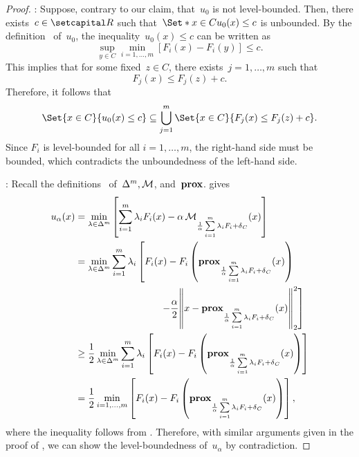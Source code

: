 \documentclass[../main]{subfiles}
\begin{document}
\begin{proof}
    : Suppose, contrary to our claim, that~$u_0$ is not level-bounded.
    Then, there exists~$c \in \setR$ such that~$\Set*{ x \in C }{ u_0(x) \le c }$ is unbounded.
    By the definition~ of~$u_0$, the inequality~$u_0(x) \le c$ can be written as
    \begin{equation}
        \sup_{y \in C} \min_{i = 1, \dots, m} [ F_i(x) - F_i(y) ] \le c.
    \end{equation}
    This implies that for some fixed~$z \in C$, there exists~$j = 1, \dots, m$ such that
    \begin{equation}
        F_j(x) \le F_j(z) + c.
    \end{equation}
    Therefore, it follows that
    \begin{equation}
        \Set{ x \in C}{ u_0(x) \le c } \subseteq \bigcup_{j = 1}^m \Set{ x \in C }{ F_j(x) \le F_j(z) + c }.
    \end{equation}
    Since $F_i$ is level-bounded for all $i = 1, \dots, m$, the right-hand side must be bounded, which contradicts the unboundedness of the left-hand side.

    : Recall the definitions~ of~$\Delta^m,\operatorname{\mathcal{M}}$, and~$\operatorname{\mathbf{prox}}$.
     gives
    \begin{equation}
        \begin{aligned}
            u_\alpha(x) &= \min_{\lambda \in \Delta^m} \left[ \sum_{i = 1}^{m} \lambda_i F_i(x) - \alpha \envelope_{\frac{1}{\alpha} \sum\limits_{i = 1}^{m} \lambda_i F_i + \indicator_C}(x) \right] \\
                      &\begin{multlined}
                          = \min_{\lambda \in \Delta^m} \sum_{i = 1}^{m} \lambda_i \left[ F_i(x) - F_i\left( \prox_{\frac{1}{\alpha} \sum\limits_{i = 1}^{m} \lambda_i F_i + \indicator_C}(x) \right) \right. \\
                          \left.- \frac{\alpha}{2} \norm*{x - \prox_{\frac{1}{\alpha} \sum\limits_{i = 1}^{m} \lambda_i F_i + \indicator_C}(x)}_2^2 \right] 
                      \end{multlined} \\
                      &\ge \frac{1}{2} \min_{\lambda \in \Delta^m} \sum_{i = 1}^{m} \lambda_i \left[ F_i(x) - F_i\left( \prox_{\frac{1}{\alpha} \sum\limits_{i = 1}^{m} \lambda_i F_i + \indicator_C}(x) \right) \right] \\
                      &= \frac{1}{2} \min_{i = 1, \dots, m} \left[ F_i(x) - F_i\left( \prox_{\frac{1}{\alpha} \sum\limits_{i = 1}^{m} \lambda_i F_i + \indicator_C}(x) \right) \right] 
        ,\end{aligned}
    \end{equation} 
    where the inequality follows from .
    Therefore, with similar arguments given in the proof of , we can show the level-boundedness of~$u_\alpha$ by contradiction.


\end{proof}
\end{document}
